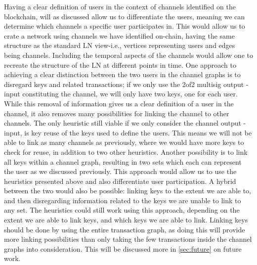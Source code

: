 Having a clear definition of users in the context of channels identified on the blockchain, will as discussed allow us to differentiate the users, meaning we can determine which channels a specific user participates in. This would allow us to crate a network using channels we have identified on-chain, having the same structure as the standard LN view-i.e., vertices representing users and edges being channels. Including the temporal aspects of the channels would allow one to recreate the structure of the LN at different points in time. 
One approach to achieving a clear distinction between the two users in the channel graphs is to disregard keys and related transactions; if we only use the 2of2 multisig output - input constituting the channel, we will only have two keys, one for each user. While this removal of information gives us a clear definition of a user in the channel, it also removes many possibilities for linking the channel to other channels. The only heuristic still viable if we only consider the channel output - input, is key reuse of the keys used to define the users. This means we will not be able to link as many channels as previously, where we would have more keys to check for reuse, in addition to two other heuristics. Another possibility is to link all keys within a channel graph, resulting in two sets which each can represent the user as we discussed previously. This approach would allow us to use the heuristics presented above and also differentiate user participation. A hybrid between the two would also be possible: linking keys to the extent we are able to, and then disregarding information related to the keys we are unable to link to any set. The heuristics could still work using this approach, depending on the extent we are able to link keys, and which keys we are able to link. Linking keys should be done by using the entire transaction graph, as doing this will provide more linking possibilities than only taking the few transactions inside the channel graphs into consideration. This will be discussed more in \cref{sec:future} on future work.

